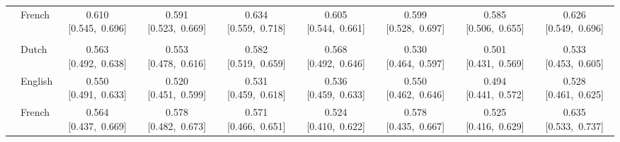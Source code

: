 \begin{longtable}[t]{llccccccc}
 & French & 0.610 [0.545,~0.696] & 0.591 [0.523,~0.669] & 0.634 [0.559,~0.718] & 0.605 [0.544,~0.661] & 0.599 [0.528,~0.697] & 0.585 [0.506,~0.655] & 0.626 [0.549,~0.696]\\

\addlinespace[3pt]
\multicolumn{9}{p{\linewidth}}{\cellcolor[HTML]{DCDCDC}{detect uncivil attacks}}\\
\addlinespace & Dutch & 0.563 [0.492,~0.638] & 0.553 [0.478,~0.616] & 0.582 [0.519,~0.659] & 0.568 [0.492,~0.646] & 0.530 [0.464,~0.597] & 0.501 [0.431,~0.569] & 0.533 [0.453,~0.605]\\

 & English & 0.550 [0.491,~0.633] & 0.520 [0.451,~0.599] & 0.531 [0.459,~0.618] & 0.536 [0.459,~0.633] & 0.550 [0.462,~0.646] & 0.494 [0.441,~0.572] & 0.528 [0.461,~0.625]\\

 & French & 0.564 [0.437,~0.669] & 0.578 [0.482,~0.673] & 0.571 [0.466,~0.651] & 0.524 [0.410,~0.622] & 0.578 [0.435,~0.667] & 0.525 [0.416,~0.629] & 0.635 [0.533,~0.737]\\*
\end{longtable}
\endgroup{}
\endgroup{}
